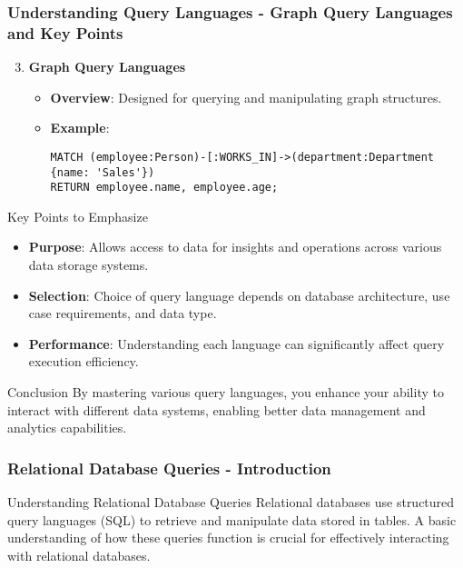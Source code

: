 \documentclass[aspectratio=169]{beamer}
\begin{document}
\begin{frame}[fragile]
    \frametitle{Understanding Query Languages - Graph Query Languages and Key Points}
    \begin{enumerate}
        \setcounter{enumi}{2}
        \item \textbf{Graph Query Languages}
        \begin{itemize}
            \item \textbf{Overview}: Designed for querying and manipulating graph structures.
            \item \textbf{Example}:
            \begin{lstlisting}[language=Cypher]
MATCH (employee:Person)-[:WORKS_IN]->(department:Department {name: 'Sales'})
RETURN employee.name, employee.age;
            \end{lstlisting}
        \end{itemize}
    \end{enumerate}

    \begin{block}{Key Points to Emphasize}
        \begin{itemize}
            \item \textbf{Purpose}: Allows access to data for insights and operations across various data storage systems.
            \item \textbf{Selection}: Choice of query language depends on database architecture, use case requirements, and data type.
            \item \textbf{Performance}: Understanding each language can significantly affect query execution efficiency.
        \end{itemize}
    \end{block}

    \begin{block}{Conclusion}
        By mastering various query languages, you enhance your ability to interact with different data systems, enabling better data management and analytics capabilities.
    \end{block}
\end{frame}

\begin{frame}[fragile]
    \frametitle{Relational Database Queries - Introduction}
    \begin{block}{Understanding Relational Database Queries}
        Relational databases use structured query languages (SQL) to retrieve and manipulate data stored in tables. A basic understanding of how these queries function is crucial for effectively interacting with relational databases.
    \end{block}
\end{frame}
\end{document}

